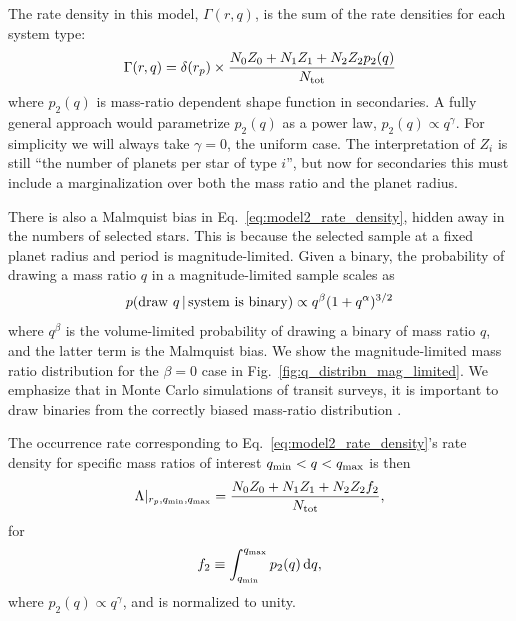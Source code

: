The rate density in this model, $\Gamma(r,q)$, is the sum of the rate 
densities for each system type:
\begin{equation}
\Gamma(r,q)
=
\delta(r_p) \times 
\frac{N_0 Z_0 + N_1 Z_1 + N_2 Z_2 p_2(q)}{N_{\rm tot}}
\label{eq:model2_rate_density}
\end{equation}
where $p_2(q)$ is mass-ratio dependent shape function in secondaries. A fully 
general approach would parametrize $p_2(q)$ as a power law, $p_2(q) \propto 
q^\gamma$. For simplicity we will always take $\gamma=0$, the uniform case.
The interpretation of $Z_i$ is still ``the number of planets per star of 
type $i$'', but now for secondaries this must include a marginalization 
over both the mass ratio and the planet radius.

There is also a Malmquist bias in Eq.~\ref{eq:model2_rate_density}, hidden 
away in the numbers of selected stars.
This is because the selected sample at a fixed planet radius and period is 
magnitude-limited.
Given a binary, the probability of drawing a mass ratio $q$ in a 
magnitude-limited sample scales as
\begin{equation}
p({\rm draw\ }q\,|\,{\rm system\ is\ binary}) \propto q^\beta 
(1+q^\alpha)^{3/2}
\label{eq:Malmquist_bias}
\end{equation}
where $q^\beta$ is the volume-limited probability of drawing a binary of mass 
ratio $q$, and the latter term is the Malmquist bias.
We show the magnitude-limited mass ratio distribution for the $\beta=0$ case 
in Fig.~\ref{fig:q_distribn_mag_limited}.
We emphasize that in Monte Carlo simulations of transit surveys, it is 
important to draw binaries from the correctly biased mass-ratio distribution 
\citep[\textit{e.g.},][]{bakos_hatsouth:_2013,sullivan_transiting_2015,
    gunther_new_2017}.

The occurrence rate corresponding to Eq.~\ref{eq:model2_rate_density}'s rate 
density for specific mass ratios of interest $q_{\rm min} < q < q_{\rm 
max}$ is then
\begin{equation}
\Lambda|_{r_p,q_{\rm min},q_{\rm max}} = 
\frac{N_0 Z_0 + N_1 Z_1 + N_2 Z_2 f_2}
{N_{\rm tot}},
\end{equation}
for
\begin{equation}
f_2 \equiv
\int_{q_{\rm min}}^{q_{\rm max}} p_2(q) \,{\rm d}q,
\end{equation}
where $p_2(q)\propto q^\gamma$, and is normalized to unity.


